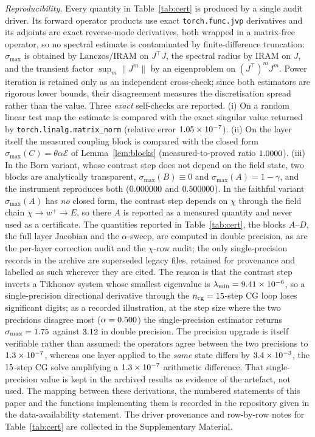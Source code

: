 \documentclass[journal,cmes,article,submit,moreauthors,pdftex]{Definitions/tsp}
\newcommand{\numv}[1]{#1}
\begin{document}
\emph{Reproducibility.} Every quantity in Table~\ref{tab:cert} is produced by a single audit
driver. Its forward operator products use exact \texttt{torch.func.jvp} derivatives and its adjoints are
exact reverse-mode derivatives, both wrapped in a matrix-free operator, so no spectral estimate
is contaminated by finite-difference truncation: $\sigma_{\max}$ is obtained by Lanczos/IRAM on
$J^{\!\top}\!J$, the spectral radius by IRAM on $J$, and the transient factor $\sup_m\|J^m\|$ by
an eigenproblem on $(J^{\!\top})^mJ^m$. Power iteration is retained only as an independent
cross-check; since both estimators are rigorous lower bounds, their disagreement measures the discretisation spread rather than the value. Three \emph{exact} self-checks are reported.
(i) On a random linear test map the estimate is compared with the exact singular value returned
by \texttt{torch.linalg.matrix\_norm} (relative error $\numv{\NumInstrErr}$). (ii) On the layer
itself the measured coupling block is compared with the closed form
$\sigma_{\max}(C)=\theta\alpha\mathcal{E}$ of Lemma~\ref{lem:blocks} (measured-to-proved ratio
$\numv{\NumSigCRatio}$). (iii) In the Born variant, whose contrast step does not depend on the
field state, two blocks are analytically transparent, $\sigma_{\max}(B)\equiv0$ and
$\sigma_{\max}(A)=1-\gamma$, and the instrument reproduces both
($\numv{\NumBornSigmaB}$ and $\numv{\NumBornSigmaA}$). In the faithful variant
$\sigma_{\max}(A)$ has \emph{no} closed form, the contrast step depends on $\chi$ through the
field chain $\chi\to w^+\to E$, so there $A$ is reported as a measured quantity and never used
as a certificate. The quantities reported in Table~\ref{tab:cert}, the blocks $A$--$D$, the
full layer Jacobian and the $\alpha$-sweep, are computed in double precision, as are the
per-layer correction audit and the $\chi$-row audit; the only single-precision records in the
archive are superseded legacy files, retained for provenance and labelled as such wherever they are
cited.
The reason is that the contrast
step inverts a Tikhonov system whose smallest eigenvalue is
$\lambda_{\min}=\numv{\NumLamMin}$, so a single-precision directional derivative through the
$n_{\mathrm{cg}}=\numv{\NumNCg}$-step CG loop loses significant digits; as a recorded
illustration, at the step size where the two precisions disagree most
($\alpha=\numv{\NumPrecAlphaWorst}$) the single-precision estimator returns
$\sigma_{\max}=\numv{\NumSigSingleWorst}$ against $\numv{\NumSigDoubleWorst}$ in double precision.
The precision upgrade is itself
verifiable rather than assumed: the operators agree between the two precisions to
$\numv{\NumOpPrecRel}$, whereas one layer applied to the \emph{same} state differs by
$\numv{\NumLayerPrecAmp}$, the $\numv{\NumNCg}$-step CG solve amplifying a
$\numv{\NumOpPrecRel}$ arithmetic difference. That single-precision value is kept in the
archived results as evidence of the artefact, not used. The mapping between these derivations, the numbered statements of this paper and the functions implementing them is recorded in the repository given in the data-availability statement.
The driver provenance and row-by-row notes for Table~\ref{tab:cert} are collected in the Supplementary Material.
\end{document}
